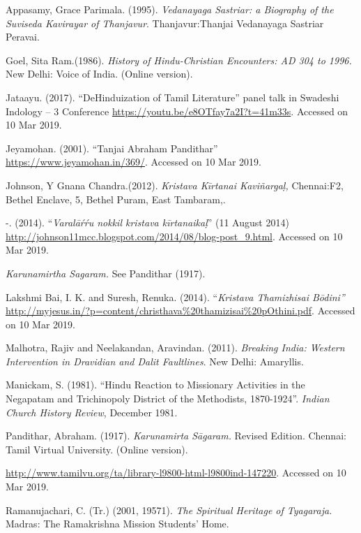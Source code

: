 \begin{thebibliography}{99}
\itemsep=0pt
 Appasamy, Grace Parimala. (1995). \textit{Vedanayaga Sastriar: a Biography of the Suviseda Kavirayar of Thanjavur}. Thanjavur:Thanjai Vedanayaga Sastriar Peravai.

  Goel, Sita Ram.(1986).\textit{ History of Hindu-Christian Encounters: AD 304 to 1996. }New Delhi: Voice of India. (Online version).

  Jataayu. (2017). “DeHinduization of Tamil Literature” panel talk in Swadeshi Indology – 3 Conference \url{https://youtu.be/e8OTfay7a2I?t=41m33s}. Accessed on 10 Mar 2019.

  Jeyamohan. (2001). “Tanjai Abraham Pandithar” \url{https://www.jeyamohan.in/369/}. Accessed on 10 Mar 2019.

  Johnson, Y Gnana Chandra.(2012).\textit{ Kristava Kīrtanai Kaviñargaḷ, }Chennai:F2, Bethel Enclave, 5, Bethel Puram, East Tambaram,.

  -. (2014). “\textit{Varalāŕŕu nokkil kristava kīrtanaikaḷ}” (11 August 2014) \url{http://johnson11mcc.blogspot.com/2014/08/blog-post_9.html}. Accessed on 10 Mar 2019.

  \textit{Karunamirtha Sagaram. }See Pandithar (1917).

  Lakshmi Bai, I. K. and Suresh, Renuka. (2014). “\textit{Kristava Thamizhisai Bōdini”} \url{http://myjesus.in/?p=content/christhava%20thamizisai%20pOthini.pdf}. Accessed on 10 Mar 2019.

  Malhotra, Rajiv and Neelakandan, Aravindan. (2011). \textit{Breaking India: Western Intervention in Dravidian and Dalit Faultlines}. New Delhi: Amaryllis.

  Manickam, S. (1981). “Hindu Reaction to Missionary Activities in the Negapatam and Trichinopoly District of the Methodists, 1870-1924”. \textit{Indian Church History Review}, December 1981.

  Pandithar, Abraham. (1917). \textit{Karunamirta Sāgaram. }Revised Edition. Chennai: Tamil Virtual University. (Online version).

  \url{http://www.tamilvu.org/ta/library-l9800-html-l9800ind-147220}. Accessed on 10 Mar 2019.

  Ramanujachari, C. (Tr.) (2001, 19571). \textit{The Spiritual Heritage of Tyagaraja. }Madras: The Ramakrishna Mission Students’ Home.


\end{thebibliography}
